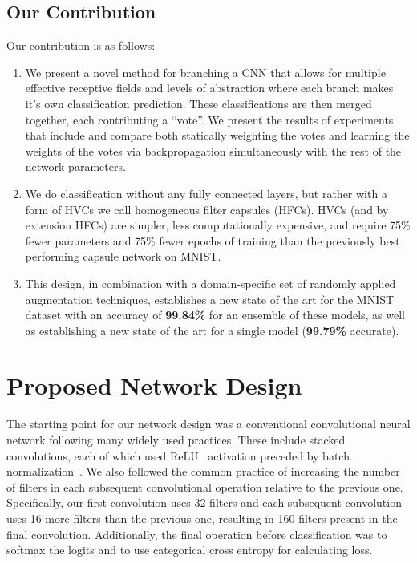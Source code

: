 \documentclass{article}
\begin{document}
\subsection{Our Contribution}
Our contribution is as follows:
\begin{enumerate}
  \item We present a novel method for branching a CNN that allows for multiple effective receptive fields and levels of abstraction where each branch makes it's own classification prediction.  These classifications are then merged together, each contributing a ``vote''.  We present the results of experiments that include and compare both statically weighting the votes and learning the weights of the votes via backpropagation simultaneously with the rest of the network parameters.
  \item We do classification without any fully connected layers, but rather with a form of HVCs we call homogeneous filter capsules (HFCs).  HVCs (and by extension HFCs) are simpler, less computationally expensive, and require 75\% fewer parameters and 75\% fewer epochs of training than the previously best performing capsule network on MNIST.\@
  \item  This design, in combination with a domain-specific set of randomly applied augmentation techniques, establishes a new state of the art for the MNIST dataset with an accuracy of \textbf{99.84\%} for an ensemble of these models, as well as establishing a new state of the art for a single model (\textbf{99.79\%} accurate).
\end{enumerate}

\section{Proposed Network Design}\label{sec:proposed_network_design}

The starting point for our network design was a conventional convolutional neural network following many widely used practices.  These include stacked  convolutions, each of which used ReLU~\cite{Glorot2011} activation preceded by batch normalization~\cite{Ioffe2015}.  We also followed the common practice of increasing the number of filters in each subsequent convolutional operation relative to the previous one.  Specifically, our first convolution uses 32 filters and each subsequent convolution uses 16 more filters than the previous one, resulting in 160 filters present in the final convolution.  Additionally, the final operation before classification was to softmax the logits and to use categorical cross entropy for calculating loss.
\end{document}
